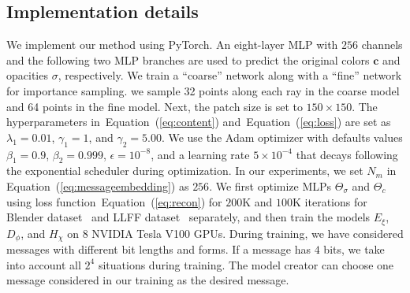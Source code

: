 \documentclass[10pt,twocolumn,letterpaper]{article}
\newcommand{\Eref}[1]{Equation~(\ref{#1})}
\def\loss{{\mathcal{L}}}
\begin{document}
\subsection{Implementation details}
We implement our method using PyTorch. An eight-layer MLP with $256$ channels and the following two MLP branches are used to predict the original colors $\mathbf{c}$ and opacities $\sigma$, respectively. We train a ``coarse'' network along with a ``fine'' network for importance sampling. we sample 32 points along each ray in the coarse model and 64 points in the fine model. Next, the patch size is set to $150\times 150$. The hyperparameters in~\Eref{eq:content} and~\Eref{eq:loss} are set as $\lambda_1=0.01$, $\gamma_1=1$, and $\gamma_2=5.00$. We use the Adam optimizer with defaults values $\beta_1 = 0.9$, $\beta_2 = 0.999$, $\epsilon = 10^{-8}$, and a learning rate $5\times10^{-4}$ that decays following the exponential scheduler during optimization. In our experiments, we set $N_m$ in \Eref{eq:messageembedding} as  $256$. We first optimize MLPs $\Theta_{\sigma}$ and $\Theta_{c}$ using loss function~\Eref{eq:recon} for $200$K and $100$K iterations for Blender dataset~\cite{nerf2020} and LLFF dataset~\cite{mildenhall2019local} separately, and then train the models $E_\xi$, $D_\phi$, and $H_\chi$ on 8 NVIDIA Tesla V100 GPUs. During training, we have considered messages with different bit lengths and forms. If a message has $4$ bits, we take into account all $2^{4}$ situations during training. The model creator can choose one message considered in our training as the desired message.



\end{document}
